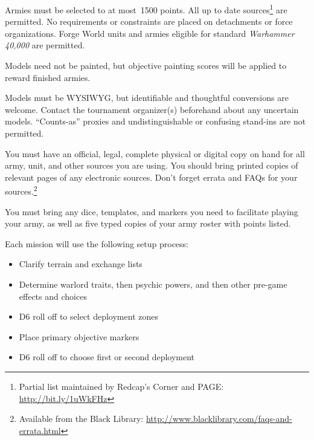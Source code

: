 \documentclass{40k}
\begin{document}

\begin{multicols}{2}


Armies must be selected to at most~1500 points.  All up to date
sources\footnote{Partial list maintained by Redcap's Corner and PAGE:
  \url{http://bit.ly/1uWkFHz}} are permitted.  No requirements or
constraints are placed on detachments or force organizations.  Forge
World units and armies eligible for standard \emph{Warhammer 40,000}
are permitted.

Models need not be painted, but objective painting scores will be
applied to reward finished armies.

Models must be WYSIWYG, but identifiable and thoughtful conversions
are welcome.  Contact the tournament organizer(s) beforehand about any
uncertain models.  ``Counts-as'' proxies and undistinguishable or
confusing stand-ins are not permitted.


You must have an official, legal, complete physical or digital copy on
hand for all army, unit, and other sources you are using.  You should
bring printed copies of relevant pages of any electronic sources.
Don't forget errata and FAQs for your sources.\footnote{Available from
  the Black Library:
  \url{http://www.blacklibrary.com/faqs-and-errata.html}}

You must bring any dice, templates, and markers you need to facilitate
playing your army, as well as five typed copies of your army roster
with points listed.


Each mission will use the following setup process:

\begin{itemize}\shortlist
\item Clarify terrain and exchange lists

\item Determine warlord traits, then psychic powers, and then other
  pre-game effects and choices

\item D6 roll off to select deployment zones

\item Place primary objective markers

\item D6 roll off to choose first or second deployment


\end{itemize}
\end{multicols}
\end{document}
